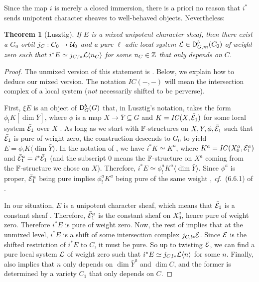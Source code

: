 \documentclass[a4paper,10pt,leqno]{amsart}
\theoremstyle{plain}
\theoremstyle{plain}
\newtheorem{thm}{Theorem}[subsection]
\theoremstyle{plain}
\theoremstyle{definition}
\theoremstyle{remark}
\newcommand{\IC}{\mathit{IC}}
\begin{document}
Since the map $i$ is merely a closed immersion, there is a priori no reason that $i^\ast$ sends unipotent character sheaves to well-behaved objects.
Nevertheless:

\begin{thm}[Lusztig]\label{thm:lusztig-restriction}
If $E$ is a mixed unipotent character sheaf, then there exist a $G_0$-orbit $j_C : C_0 \to \cal{U}_0$ and a pure $\ell$-adic local system $\cal{L} \in \sf{D}_{G, m}^b(C_0)$ of weight zero such that $i^\ast E \simeq j_{C, !\ast} \cal{L}\langle n_C\rangle$ for some $n_C \in \bb{Z}$ that only depends on $C$.
\end{thm}

\begin{proof}
The unmixed version of this statement is \cite[Thm.\ 6.5(c)]{lusztig_1984_intersection}.
Below, we explain how to deduce our mixed version.
The notation $\IC(-, -)$ will mean the intersection complex of a local system (\emph{not} necessarily shifted to be perverse).

First, $\xi E$ is an object of $\sf{D}_G^b(G)$ that, in Lusztig's notation, takes the form $\phi_!K[\dim \bar{Y}]$, where $\phi$ is a map $X \to \bar{Y} \subseteq G$ and $K = \IC(X, \bar{\cal{E}}_1)$ for some local system $\bar{\cal{E}}_1$ over $X$ \cite[\S{4}]{lusztig_1984_intersection}.
As long as we start with $\bb{F}$-structures on $X, Y, \phi, \bar{\cal{E}}_1$ such that $\bar{\cal{E}}_1$ is pure of weight zero, the construction descends to $G_0$ to yield $E = \phi_!K\langle \dim \bar{Y}\rangle$.
In the notation of \cite[\S{6.6}]{lusztig_1984_intersection}, we have $i^\ast K \simeq K^a$, where $K^a = \IC(X_0^a, \bar{\cal{E}}_1^a)$ and $\bar{\cal{E}}_1^a = i^\ast \bar{\cal{E}}_1$ (and the subscript $0$ means the $\bb{F}$-structure on $X^a$ coming from the $\bb{F}$-structure we chose on $X$).
Therefore, $i^\ast E \simeq \phi_!^a K^a \langle \dim \bar{Y}\rangle$.
Since $\phi^a$ is proper, $\bar{\cal{E}}_1^a$ being pure implies $\phi_!^a K^a$ being pure of the same weight \cite{deligne_1980}, \emph{cf.}\ (6.6.1) of \cite{lusztig_1984_intersection}.

In our situation, $E$ is a unipotent character sheaf, which means that $\bar{\cal{E}}_1$ is a constant sheaf \cite[\S{3.1}, \S{4.4}]{lusztig_1985_1}.
Therefore, $\bar{\cal{E}}_1^a$ is the constant sheaf on $X_0^a$, hence pure of weight zero.
Therefore $i^\ast E$ is pure of weight zero.
Now, the rest of \cite[Thm.\ 6.5(c)]{lusztig_1984_intersection} implies that at the unmixed level, $i^\ast E$ is a shift of some intersection complex $j_{C, !\ast}\cal{E}$.
Since $\cal{E}$ is the shifted restriction of $i^\ast E$ to $C$, it must be pure.
So up to twisting $\cal{E}$, we can find a pure local system $\cal{L}$ of weight zero such that $i^\ast E \simeq j_{C, !\ast} \cal{L}\langle n\rangle$ for some $n$.
Finally, \cite[Thm.\ 6.5(c)]{lusztig_1984_intersection} also implies that $n$ only depends on $\dim \bar{Y}^a$ and $\dim C$, and the former is determined by a variety $C_1$ that only depends on $C$.
\end{proof}
\end{document}
